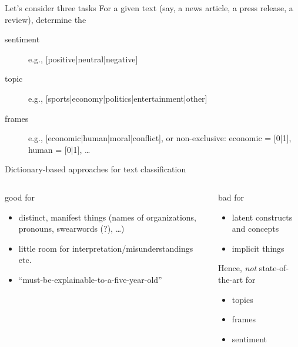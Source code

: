 \begin{frame}{Let's consider three tasks}
	For a given text (say, a news article, a press release, a review), determine the
	\begin{description}
		\item[sentiment] e.g., [positive|neutral|negative]
		\item[topic] e.g., [sports|economy|politics|entertainment|other]
		\item[frames] e.g., [economic|human|moral|conflict], or non-exclusive: economic = [0|1], human = [0|1], \ldots
	\end{description}
\end{frame}






\begin{frame}{Dictionary-based approaches for text classification}
  \begin{columns}[t]
    \begin{block}{good for}
      \begin{itemize}
      \item distinct, manifest things (names of organizations, pronouns, swearwords (?), \ldots)
      \item little room for interpretation/misunderstandings etc.
      \item ``must-be-explainable-to-a-five-year-old''
      \end{itemize}
      \pause
    \end{block}
    \begin{alertblock}{bad for}
      \begin{itemize}
      \item latent constructs and concepts
      \item implicit things
      \end{itemize}
      \pause
      Hence, \emph{not} state-of-the-art for
      \begin{itemize}
      \item topics
      \item frames
      \item sentiment
      \end{itemize}
    \end{alertblock}
  \end{columns}
\end{frame}


